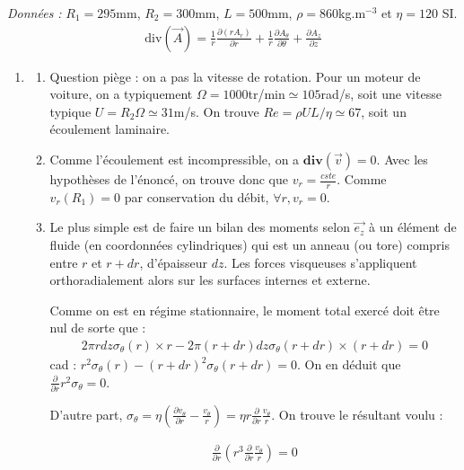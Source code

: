 \textit{Données :} $R_1=295$mm, $R_2=300$mm, $L=500$mm, $\rho=860$kg.m$^{-3}$ et $\eta=120$ SI. 
\begin{align*}
	\mathrm{div}(\vec{A}) =
\frac{1}{r}\frac{\partial (r A_r)}{\partial r} + \frac{1}{r}\frac{\partial A_\theta}{\partial \theta} + \frac{\partial A_z}{\partial z}
\end{align*}	


\newpage

\begin{correction}

\begin{enumerate}

\item

\begin{enumerate}
		
	\item Question piège : on a pas la vitesse de rotation. Pour un moteur de voiture, on a typiquement $\Omega=1000$tr/min$\simeq105$rad/s, soit une vitesse typique $U=R_2\Omega\simeq31$m/s. On trouve $Re=\rho UL/\eta\simeq 67$, soit un écoulement laminaire.
	
	\item Comme l'écoulement est incompressible, on a $\mathbf{div}(\vec{v})=0$. Avec les hypothèses de l'énoncé, on trouve donc que $v_r=\frac{cste}{r}$. Comme $v_r(R_1)=0$ par conservation du débit, $\forall r, v_r=0$.
	
	\item Le plus simple est de faire un bilan des moments selon $\vec{e_z}$ à un élément de fluide (en coordonnées cylindriques) qui est un anneau (ou tore) compris entre $r$ et $r+dr$, d'épaisseur $dz$. Les forces visqueuses s'appliquent orthoradialement alors sur les surfaces internes et externe. 

Comme on est en régime stationnaire, le moment total exercé doit être nul de sorte que : 
\begin{align*}
	2\pi r dz \sigma_\theta(r)\times r - 2\pi (r+dr) dz \sigma_\theta(r+dr)\times (r+dr) = 0
\end{align*}
cad : $r^2 \sigma_\theta(r) - (r+dr)^2 \sigma_\theta(r+dr) = 0$. On en déduit que $\frac{\partial}{\partial r}r^2\sigma_\theta=0$.

D'autre part, $\sigma_\theta=\eta\left(\frac{\partial v_\theta}{\partial r}-\frac{v_\theta}{r}\right) =\eta r \frac{\partial}{\partial r}\frac{v_\theta}{r} $. On trouve le résultant voulu :

	\begin{align*}
		\frac{\partial}{\partial r}\left(r^3 \frac{\partial}{\partial r}\frac{v_\theta}{r} \right) =0
	\end{align*}
	

\end{enumerate}
\end{enumerate}
\end{correction}
